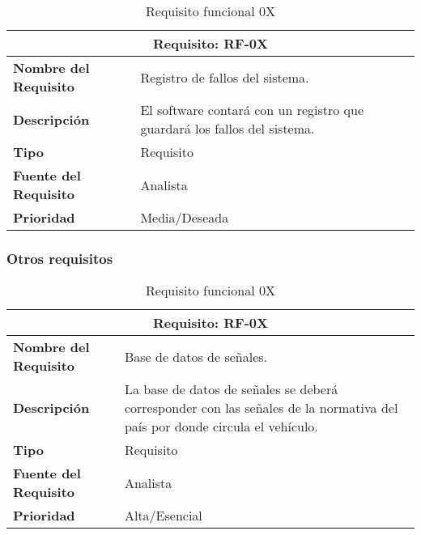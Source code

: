 \begin{table}[H]
\begin{center}
\begin{tabular}{p{} p{7cm}}
\multicolumn{2}{c}{\textbf{Requisito: RF-0X} } \\
\hline \hline
\textbf{Nombre del Requisito} & Registro de fallos del sistema.\\
\hline
\textbf{Descripción} & El software contará con un registro que guardará los fallos del sistema.\\
\hline
\textbf{Tipo} & Requisito  \\
\hline
\textbf{Fuente del Requisito} & Analista  \\
\hline
\textbf{Prioridad} & Media/Deseada \\ \hline
\end{tabular}
\caption{Requisito funcional 0X}
\label{tab:personal}
\end{center}
\end{table}

\subsubsection{Otros requisitos}

\begin{table}[H]
\begin{center}
\begin{tabular}{p{} p{7cm}}
\multicolumn{2}{c}{\textbf{Requisito: RF-0X} } \\
\hline \hline
\textbf{Nombre del Requisito} & Base de datos de señales.\\
\hline
\textbf{Descripción} & La base de datos de señales se deberá corresponder con las señales de la normativa del país por donde circula el vehículo.\\
\hline
\textbf{Tipo} & Requisito  \\
\hline
\textbf{Fuente del Requisito} & Analista  \\
\hline
\textbf{Prioridad} & Alta/Esencial \\ \hline
\end{tabular}
\caption{Requisito funcional 0X}
\label{tab:personal}
\end{center}
\end{table}

